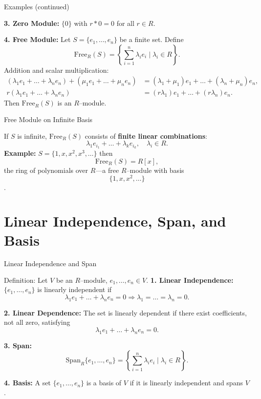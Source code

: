 \documentclass[11pt,aspectratio=43,ignorenonframetext,t]{beamer}
\begin{document}
\begin{frame}{Examples (continued)}
\begin{block}{}
\textbf{3. Zero Module:} $\{0\}$ with $r*0=0$ for all $r\in R$.  

\textbf{4. Free Module:}  
Let $S=\{e_1,\dots,e_n\}$ be a finite set.  
Define
\[
\mathrm{Free}_R(S) = \left\{ \sum_{i=1}^n \lambda_i e_i \mid \lambda_i\in R \right\}.
\]
Addition and scalar multiplication:
\[
\begin{aligned}
(\lambda_1 e_1+\dots+\lambda_n e_n) + (\mu_1 e_1+\dots+\mu_n e_n)
&= (\lambda_1+\mu_1)e_1+\dots+(\lambda_n+\mu_n)e_n,\\
r(\lambda_1 e_1+\dots+\lambda_n e_n)
&= (r\lambda_1)e_1+\dots+(r\lambda_n)e_n.
\end{aligned}
\]
Then $\mathrm{Free}_R(S)$ is an $R$–module.
\end{block}
\end{frame}

\begin{frame}{Free Module on Infinite Basis}
\begin{block}{}
    If $S$ is infinite, $\mathrm{Free}_R(S)$ consists of \textbf{finite linear combinations}:
\[
\lambda_1 e_{i_1}+\dots+\lambda_k e_{i_k}, \quad \lambda_i\in R.
\]
\textbf{Example:} $S=\{1,x,x^2,x^3,\dots\}$ then
\[
\mathrm{Free}_R(S)=R[x],
\]
the ring of polynomials over $R$—a free $R$–module with basis $$\{1,x,x^2,\dots\}$$.
\end{block}
\end{frame}

\section{Linear Independence, Span, and Basis}

\begin{frame}{Linear Independence and Span}
\vspace{-0.3cm}
\begin{block}{Definition: Let $V$ be an $R$–module, $e_1,\dots,e_n\in V$.}
\textbf{1. Linear Independence:}  
$\{e_1,\dots,e_n\}$ is linearly independent if
\[
\lambda_1 e_1+\dots+\lambda_n e_n=0 \Rightarrow \lambda_1=\dots=\lambda_n=0.
\]

\textbf{2. Linear Dependence:}  
The set is linearly dependent if there exist coefficients, not all zero, satisfying
\[
\lambda_1 e_1+\dots+\lambda_n e_n=0.
\]

\textbf{3. Span:}  
\vspace{-0.5cm}
\[
\mathrm{Span}_R\{e_1,\dots,e_n\}=\left\{\sum_{i=1}^n\lambda_i e_i\mid\lambda_i\in R\right\}.
\]

\textbf{4. Basis:}  
\vspace{-0.1cm}
A set $\{e_1,\dots,e_n\}$ is a basis of $V$ if it is linearly independent and spans $V$.
\end{block}
\end{frame}
\end{document}
